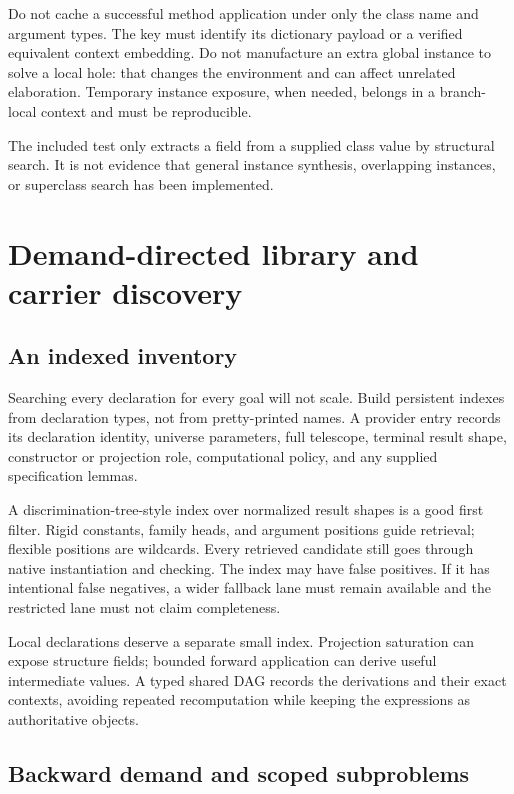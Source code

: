 Do not cache a successful method application under only the class name and argument types. The key must identify its dictionary payload or a verified equivalent context embedding. Do not manufacture an extra global instance to solve a local hole: that changes the environment and can affect unrelated elaboration. Temporary instance exposure, when needed, belongs in a branch-local context and must be reproducible.

The included  test only extracts a field from a supplied class value by structural search. It is not evidence that general instance synthesis, overlapping instances, or superclass search has been implemented.

\section{Demand-directed library and carrier discovery}
\label{sec:inventory}

\subsection{An indexed inventory}

Searching every declaration for every goal will not scale. Build persistent indexes from declaration types, not from pretty-printed names. A provider entry records its declaration identity, universe parameters, full telescope, terminal result shape, constructor or projection role, computational policy, and any supplied specification lemmas.

A discrimination-tree-style index over normalized result shapes is a good first filter. Rigid constants, family heads, and argument positions guide retrieval; flexible positions are wildcards. Every retrieved candidate still goes through native instantiation and checking. The index may have false positives. If it has intentional false negatives, a wider fallback lane must remain available and the restricted lane must not claim completeness.

Local declarations deserve a separate small index. Projection saturation can expose structure fields; bounded forward application can derive useful intermediate values. A typed shared DAG records the derivations and their exact contexts, avoiding repeated recomputation while keeping the expressions as authoritative objects.

\subsection{Backward demand and scoped subproblems}

